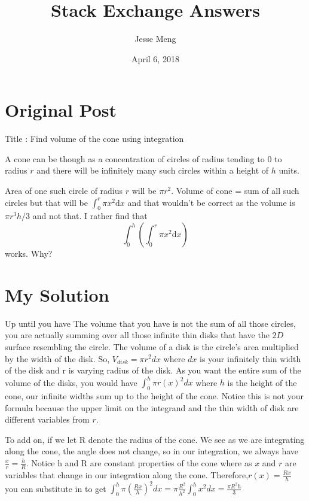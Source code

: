 \documentclass{article}
\title{Stack Exchange Answers}
\author{Jesse Meng }
\date{April 6, 2018}
\begin{document}
\maketitle

\section{Original Post}
Title : Find volume of the cone using integration

A cone can be though as a concentration of circles of radius tending to $0$ to radius $r$ and there will be infinitely many such circles within a height of $h$ units. 

Area of one such circle of radius $r$ will be $\pi r^2$. 
Volume of cone = sum of all such circles but that will be $\int_{0}^{r} \pi x^2 \text {d}x$ and that wouldn't be correct as the volume is $\pi r^3 h /3$ and not that. I rather find that $$\int_{0}^{h}\left(\int_{0}^{r} \pi x^2 \text {d}x\right)$$ works.
Why?
\section{My Solution}
Up until you have The volume that you have is not the sum of all those circles, you are actually summing over all those infinite thin disks that have the $2D$ surface resembling the circle. The volume of a disk is the circle's area multiplied by the width of the disk. So, $V_{disk}=\pi r^2dx$ where $dx$ is your infinitely thin width of the disk and r is varying radius of the disk. As you want the entire sum of the volume of the disks, you would have $\int_{0}^{h}\pi r(x)^2dx$ where $h$ is the height of the cone, our infinite widths sum up to the height of the cone. Notice this is not your formula because the upper limit on the integrand and the thin width of disk are different variables from $r$. 

To add on, if we let R denote the radius of the cone. We see as we are integrating along the cone, the angle does not change, so in our integration, we always have $\frac{x}{r}=\frac{h}{R}$. Notice h and R are constant properties of the cone where as $x$ and $r$ are variables that change in our integration along the cone. Therefore,$r(x)=\frac{Rx}{h}$ you can substitute in to get $\int_{0}^{h}\pi {(\frac{Rx}{h})}^2dx=\pi \frac{R^2}{h^2} \int_{0}^{h} x^2dx=\frac{\pi R^2h}{3}$
\end{document}
